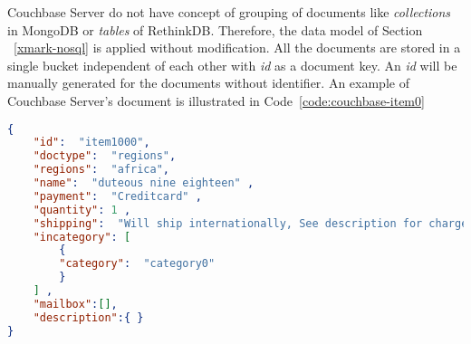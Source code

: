 
Couchbase Server do not have concept of grouping of documents like \textit{collections} in MongoDB  or \textit{tables} of RethinkDB. Therefore, the data model of Section ~\ref{xmark-nosql} is applied without modification. All the documents are stored in a single bucket independent of each other with \textit{id} as a document key. An \textit{id} will be manually generated for the documents without identifier.
 An example of Couchbase Server's document is illustrated in Code~\ref{code:couchbase-item0}
\begin{lstlisting}[language=JSON,caption=Couchbase psudo-document of XMARk data for item with id item1000, label=code:couchbase-item0]
{
	"id":  "item1000",
	"doctype":  "regions",
	"regions":  "africa",
	"name":  "duteous nine eighteen" ,
	"payment":  "Creditcard" ,
	"quantity": 1 ,
	"shipping":  "Will ship internationally, See description for charges" ,
	"incategory": [
		{
		"category":  "category0"
		}
	] ,
	"mailbox":[],
	"description":{ }
}
\end{lstlisting} 